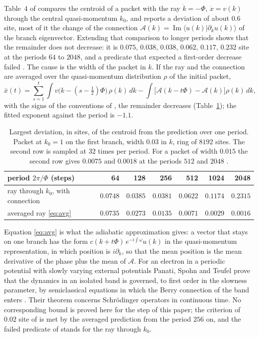 Table~4 of \cite{g9} compares the centroid of a packet with the ray $\dot k=-\Phi$, $\dot x=v(k)$ through the central quasi-momentum $k_0$, and reports a deviation of about $0.6$ site, most of it the change of the connection $\mathcal{A}(k)=\operatorname{Im}\langle u(k)|\partial_ku(k)\rangle$ of the branch eigenvector. Extending that comparison to longer periods shows that the remainder does not decrease: it is $0.075$, $0.038$, $0.038$, $0.062$, $0.117$, $0.232$ site at the periods $64$ to $2048$, and a predicate that expected a first-order decrease failed \cite{comp4s}. The cause is the width of the packet in $k$. If the ray and the connection are averaged over the quasi-momentum distribution $\rho$ of the initial packet,
\begin{equation}\label{eq:avg}
\bar x(t)=\sum_{s=1}^{t}\int v\bigl(k-(s-\tfrac12)\Phi\bigr)\,\rho(k)\,dk-\int\bigl[\mathcal{A}(k-t\Phi)-\mathcal{A}(k)\bigr]\rho(k)\,dk ,
\end{equation}
with the signs of the conventions of \cite{g9}, the remainder decreases (Table~\ref{tab:avg}); the fitted exponent against the period is $-1.1$.

\begin{table}[ht]\centering\small
\begin{tabular}{@{}lrrrrrr@{}}\toprule
period $2\pi/\Phi$ (steps) & 64 & 128 & 256 & 512 & 1024 & 2048\\\midrule
ray through $k_0$, with connection & $0.0748$ & $0.0385$ & $0.0381$ & $0.0622$ & $0.1174$ & $0.2315$\\
averaged ray \eqref{eq:avg} & $0.0735$ & $0.0273$ & $0.0135$ & $0.0071$ & $0.0029$ & $0.0016$\\\bottomrule
\end{tabular}
\caption{Largest deviation, in sites, of the centroid from the prediction over one period. Packet at $k_0=1$ on the first branch, width $0.03$ in $k$, ring of $8192$ sites. The second row is sampled at $32$ times per period. For a packet of width $0.015$ the second row gives $0.0075$ and $0.0018$ at the periods $512$ and $2048$ \cite{comp4s}.}\label{tab:avg}
\end{table}

Equation \eqref{eq:avg} is what the adiabatic approximation gives: a vector that stays on one branch has the form $c(k+t\Phi)\,e^{-i\int\omega}u(k)$ in the quasi-momentum representation, in which position is $i\partial_k$, so that the mean position is the mean derivative of the phase plus the mean of $\mathcal{A}$. For an electron in a periodic potential with slowly varying external potentials Panati, Spohn and Teufel prove that the dynamics in an isolated band is governed, to first order in the slowness parameter, by semiclassical equations in which the Berry connection of the band enters \cite{pst}. Their theorem concerns Schr\"odinger operators in continuous time. No corresponding bound is proved here for the step of this paper; the criterion of $0.02$ site of \cite{g9} is met by the averaged prediction from the period $256$ on, and the failed predicate of \cite{g9} stands for the ray through $k_0$.

